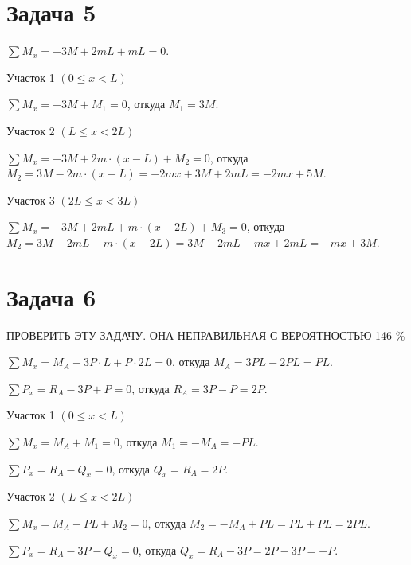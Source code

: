 \section{Задача 5}

$ \sum M_x = -3M + 2mL + mL = 0 $.

\vspace{1.5ex}

Участок 1 $ \left(0 \le x < L\right) $

$ \sum M_x = -3M + M_1 = 0 $,
откуда $ M_1 = 3M $.

\vspace{1.5ex}

Участок 2 $ \left(L \le x < 2L\right) $

$ \sum M_x = -3M + 2m \cdot \left(x- L\right) + M_2 =  0 $,
откуда $ M_2 = 3M - 2m \cdot \left(x - L\right) = -2mx + 3M + 2mL = -2mx + 5M $.

\vspace{1.5ex}

Участок 3 $ \left(2L \le x < 3L\right) $

$ \sum M_x = -3M + 2mL + m \cdot \left(x- 2L\right) + M_3 =  0 $,
откуда $ M_2 = 3M - 2mL - m \cdot \left(x - 2L\right) = 3M - 2mL - mx + 2mL = -mx + 3M $.


\section{Задача 6}
ПРОВЕРИТЬ ЭТУ ЗАДАЧУ. ОНА НЕПРАВИЛЬНАЯ С ВЕРОЯТНОСТЬЮ 146 \%

$ \sum M_x = M_A - 3P \cdot L + P \cdot 2L = 0 $,
    откуда $ M_A = 3PL - 2PL = PL $.

$ \sum P_x = R_A - 3P + P = 0 $,
откуда $ R_A = 3P - P = 2P $.

\vspace{1.5ex}

Участок 1 $ \left(0 \le x < L\right) $

$ \sum M_x = M_A + M_1 = 0 $,
откуда $ M_1 = -M_A = -PL $.

$ \sum P_x = R_A - Q_x = 0 $,
откуда $ Q_x = R_A = 2P $.

\vspace{1.5ex}

Участок 2 $ \left(L \le x < 2L\right) $

$ \sum M_x = M_A - PL + M_2 = 0 $,
откуда $ M_2 = -M_A + PL = PL + PL = 2PL $.

$ \sum P_x = R_A - 3P - Q_x = 0 $,
откуда $ Q_x = R_A - 3P = 2P - 3P = -P $.


